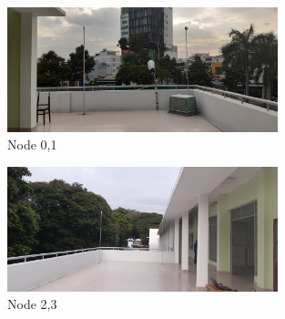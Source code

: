 \documentclass[\main/main.tex]{subfiles}
\begin{document}

\begin{figure}[H]      
    \centering
    \includegraphics[width=0.7\textwidth]{arena_06.jpg}
    \caption{Node 0,1}
    \label{fig:node_0_1}
\end{figure}


\begin{figure}[H]      
    \centering
    \includegraphics[width=0.7\textwidth]{arena_05.jpg}
    \caption{Node 2,3}
    \label{fig:node_2_3}
\end{figure}
\end{document}
